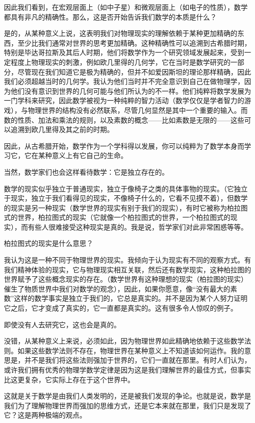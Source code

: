 \documentclass{article}
\begin{document}
因此我们看到，在宏观层面上（如中子星）和微观层面上（如电子的性质），数学都具有非凡的精确性。那么，这是否开始告诉我们数学的本质是什么？

是的，从某种意义上说，这表明我们对物理现实的理解依赖于某种更加精确的东西，至少比我们通常对世界的思考更加精确。这种精确性可以追溯到古希腊时期，特别是毕达哥拉斯及其后人时期，他们将数学作为一个研究领域发展起来，受到一定程度上物理现实的刺激，例如欧几里得的几何学，它在当时是数学研究的一部分，尽管现在我们知道它是极为精确的，但并不如爱因斯坦的理论那样精确，因此我们必须超越当时的几何学。我认为他们当时并不完全意识到自己在做物理学，因为他们没有意识到世界的几何可能与他们所认为的不一样。他们纯粹将数学发展为一门学科来研究，因此数学被视为一种纯粹的智力活动（数学仅仅是学者智力的游戏），与物理世界的结构没有必然联系，尽管几何显然是其中一个重要的输入。而数的性质、加法和乘法的规则，以及素数的概念——比如素数是无限的——这些可以追溯到欧几里得及其之前的时期。

因此，从古希腊开始，数学作为一个学科得以发展，你可以纯粹为了数学本身而学习它，它在某种意义上有它自己的生命。

当然，数学家们也会这样看待数学：它是独立存在的。

数学的现实似乎独立于普通现实，独立于像椅子之类的具体事物的现实。（它独立于现实，独立于我们看得见的现实，不像椅子什么的，它看不见摸不着），但数学的现实是另一种现实（数学世界的现实有别于我们的现实），有时它被称为柏拉图式的世界，柏拉图式的现实（它就像一个柏拉图式的世界，一个柏拉图式的现实），而有些人很难接受这种现实是真的。我是说，哲学家们对此非常困惑等等。

柏拉图式的现实是什么意思？

我认为这是一种不同于物理世界的现实。我倾向于认为现实有不同的观察方式。有我们精神体验的现实，它与物理现实相互关联，然后还有数学现实，这种柏拉图的世界赋予了这些概念现实的存在。（数学世界有这种理想的现实（柏拉图的现实）催生了物质世界中我们对数学的观念），因此，如果你愿意，像“没有最大的素数”这样的数学事实是独立于我们的，它总是真实的。并不是因为某个人努力证明它之后，它才变成了真实的，它一直都是真实的。这有很多令人惊叹的例子。

即使没有人去研究它，这也会是真的。

没错，从某种意义上来说，必须如此，因为物理世界如此精确地依赖于这些数学法则。如果这些数学法则不存在，物理世界在某种意义上不知道该如何运作。我的意思是，并不是我们将这些法则强加于世界的，它们一直就在那里。有时人们认为，或许我们拥有优秀的物理学数学定律是因为这是我们理解世界的最佳方式，但事实比这更复杂，它实际上存在于这个世界中。

这就是关于数学是由我们人类发明的，还是被我们发现的争论。也就是说，数学是我们为了理解物理世界而强加的思维方式，还是它本来就在那里，我们只是发现了它？这是两种极端的观点。
\end{document}
